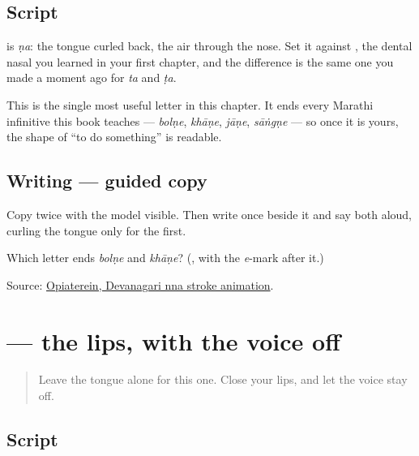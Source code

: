 \subsection*{Script}
\begin{quote}
\end{quote}

\textbf{} is \emph{ṇa}: the tongue curled back, the air through the nose. Set it against \textbf{}, the dental nasal you learned in your first chapter, and the difference is the same one you made a moment ago for \emph{ta} and \emph{ṭa}.

This is the single most useful letter in this chapter. It ends every Marathi infinitive this book teaches — \emph{bolṇe}, \emph{khāṇe}, \emph{jāṇe}, \emph{sāṅgṇe} — so once it is yours, the shape of \textquotedblleft{}to do something\textquotedblright{} is readable.

\subsection*{Writing — guided copy}

Copy \textbf{} twice with the model visible. Then write \textbf{} once beside it and say both aloud, curling the tongue only for the first.

\begin{tcolorbox}[breakable,colback=teal!4,colframe=teal!35!black,title={Before you move on}]
Which letter ends \emph{bolṇe} and \emph{khāṇe}? (\textbf{}, with the \emph{e}-mark after it.)

Source: \href{https://commons.wikimedia.org/wiki/File:Deva-\%E0\%A4\%A3-order.gif}{Opiaterein, Devanagari nna stroke animation}.
\end{tcolorbox}
\section[\texorpdfstring{\mr{प} (pa)}{प (pa)}]{ — the lips, with the voice off}

\label{lesson:MR-W07-pa}



\begin{quote}
Leave the tongue alone for this one. Close your lips, and let the voice stay off.
\end{quote}

\subsection*{Script}
\begin{quote}
\end{quote}

